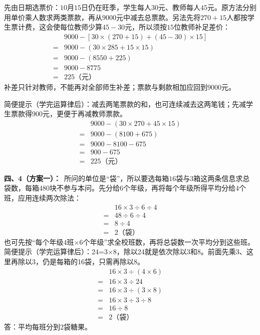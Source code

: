 \documentclass[multi=snippet,border=0pt]{standalone}
\newenvironment{snippet}[3]{\begin{minipage}{#1bp}\color{answerred}\fontsize{#2}{#3}\selectfont\raggedright}{\end{minipage}}
\begin{document}
\begin{snippet}{505}{11.5}{14}先由日期选票价：\(10\)月\(15\)日仍在旺季，学生每人\(30\)元、教师每人\(45\)元。原方法分别用单价乘人数求两类票款，再从\(9000\)元中减去总票款。另法先将\(270+15\)人都按学生票计费，这会使每位教师少算\(45-30\)元，所以须按\(15\)位教师补足差价：\[\begin{aligned}&9000-[30\times(270+15)+(45-30)\times15]\\={}&9000-(30\times285+15\times15)\\={}&9000-(8550+225)\\={}&9000-8775\\={}&225\text{（元）}\end{aligned}\]补差只针对教师，不能再对全部师生补差；票款与剩款相加应回到\(9000\)元。\par 简便提示（学完运算律后）：减去两笔票款的和，也可连续减去这两笔钱；先减学生票款得\(900\)元，更便于再减教师票款。\[\begin{aligned}&9000-(30\times270+45\times15)\\={}&9000-(8100+675)\\={}&9000-8100-675\\={}&900-675\\={}&225\text{（元）}\end{aligned}\]\end{snippet}
\begin{snippet}{505}{11.5}{14}\textbf{四、4（方案一）：}\ 所问的单位是“袋”，所以要选每箱\(16\)袋与\(3\)箱这两条信息求总袋数，每箱\(480\)块不参与本问。先分给\(6\)个年级，再将每个年级所得平均分给\(4\)个班，应用连续两次除法：\[\begin{aligned}&16\times3\div6\div4\\={}&48\div6\div4\\={}&8\div4\\={}&2\text{（袋）}\end{aligned}\]也可先按“每个年级\(4\)班\(\times6\)个年级”求全校班数，再将总袋数一次平均分到这些班。简便提示（学完运算律后）：24=3×8，除以24就是依次除以3和8。前面先乘3、这里再除以3，仍是每箱的16袋，只需再除以8。\[\begin{aligned}&16\times3\div(4\times6)\\={}&16\times3\div24\\={}&16\times3\div(3\times8)\\={}&16\times3\div3\div8\\={}&16\div8\\={}&2\text{（袋）}\end{aligned}\]答：平均每班分到2袋糖果。\end{snippet}
\end{document}
